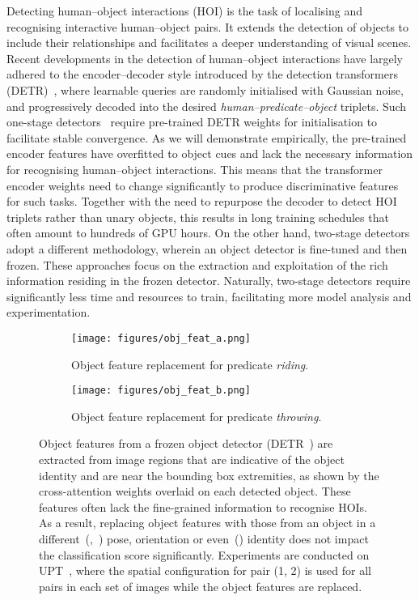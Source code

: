 \documentclass[10pt,twocolumn,letterpaper]{article}
\begin{document}
Detecting human--object interactions (HOI) is the task of localising and recognising interactive human--object pairs. It extends the detection of objects to include their relationships and facilitates a deeper understanding of visual scenes. 
Recent developments in the detection of human--object interactions have largely adhered to the encoder--decoder style introduced by the detection transformers (DETR)~\cite{detr}, where learnable queries are randomly initialised with Gaussian noise, and progressively decoded into the desired \textit{human–predicate–object} triplets. Such one-stage detectors~\cite{qpic, hotr, hoitrans, asnet, cdn, ssrt} require pre-trained DETR weights for initialisation to facilitate stable convergence. As we will demonstrate empirically, the pre-trained encoder features have overfitted to object cues and lack the necessary information for recognising human--object interactions. This means that the transformer encoder weights need to change significantly to produce discriminative features for such tasks. Together with the need to repurpose the decoder to detect HOI triplets rather than unary objects, this results in long training schedules that often amount to hundreds of GPU hours. On the other hand, two-stage detectors adopt a different methodology, wherein an object detector is fine-tuned and then frozen. These approaches focus on the extraction and exploitation of the rich information residing in the frozen detector. Naturally, two-stage detectors require significantly less time and resources to train, facilitating more model analysis and experimentation.

\begin{figure*}[t]
   \begin{subfigure}[t]{0.49\linewidth}
      \centering
      \texttt{[image: figures/obj\_feat\_a.png]}
      \caption{Object feature replacement for predicate \textit{riding}.}
      \label{fig:obj_feat_riding}
   \end{subfigure}
\begin{subfigure}[t]{0.49\linewidth}
      \centering
      \texttt{[image: figures/obj\_feat\_b.png]}
      \caption{Object feature replacement for predicate \textit{throwing}.}
      \label{fig:obj_feat_throwing}
   \end{subfigure}
   \vspace{5px}
   \caption{
   	Object features from a frozen object detector (DETR~\cite{detr}) are extracted from image regions that are indicative of the object identity and are near the bounding box extremities, as shown by the cross-attention weights overlaid on each detected object. These features often lack the fine-grained information to recognise HOIs. As a result, replacing object features with those from an object in a different~(,~) pose, orientation or even~() identity does not impact the classification score significantly. Experiments are conducted on UPT~\cite{upt}, where the spatial configuration for pair (1, 2) is used for all pairs in each set of images while the object features are replaced.
   }
   \label{fig:obj_feat}
\end{figure*}
\end{document}
